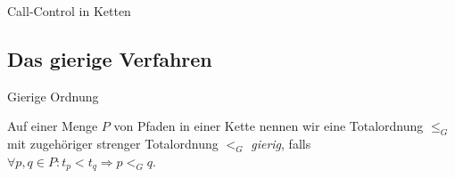\begin{section}{Call-Control in Ketten}

\subsection{Das gierige Verfahren}

\begin{frame}{Gierige Ordnung}
	\begin{definition}
		Auf einer Menge $P$ von Pfaden in einer Kette nennen wir eine Totalordnung $\leq_G$ mit zugehöriger strenger Totalordnung
		$<_G$ {\em gierig},
		falls $\forall p, q \in P \colon t_p < t_q \Rightarrow p <_G q$.
	\end{definition}
\end{frame}


\end{section}
